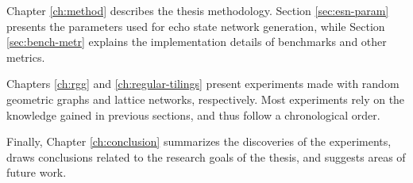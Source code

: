 Chapter \ref{ch:method} describes the thesis methodology. Section
\ref{sec:esn-param} presents the parameters used for echo state network
generation, while Section \ref{sec:bench-metr} explains the implementation
details of benchmarks and other metrics.

Chapters \ref{ch:rgg} and \ref{ch:regular-tilings} present experiments made with
random geometric graphs and lattice networks, respectively. Most experiments
rely on the knowledge gained in previous sections, and thus follow a
chronological order.

Finally, Chapter \ref{ch:conclusion} summarizes the discoveries of the
experiments, draws conclusions related to the research goals of the thesis, and
suggests areas of future work.

